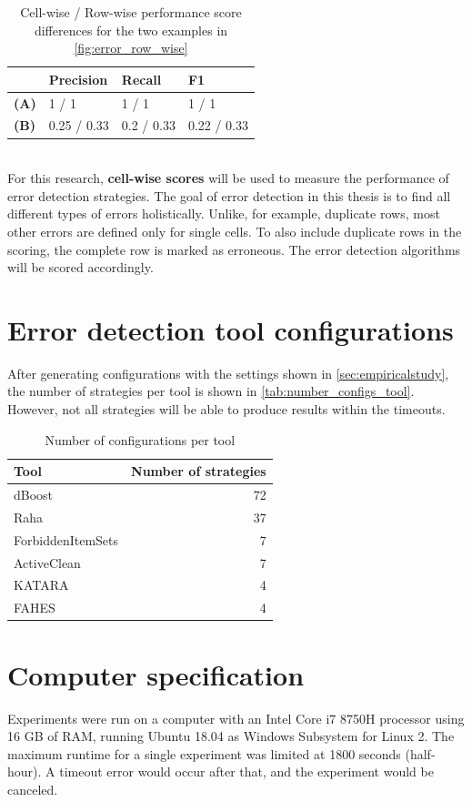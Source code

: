 \begin{table}[h]
\centering
\begin{tabular}{l|lll}
\textbf{}    & \textbf{Precision} & \textbf{Recall} & \textbf{F1} \\ \hline
\textbf{(A)} & 1 / 1              & 1 / 1           & 1 / 1       \\
\textbf{(B)} & 0.25 / 0.33        & 0.2 / 0.33      & 0.22 / 0.33
\end{tabular}
\caption{Cell-wise / Row-wise performance score differences for the two examples in \autoref{fig:error_row_wise}}
\label{tab:cell_vs_row_scores}
\end{table}

~\\For this research, \textbf{cell-wise scores} will be used to measure the performance of error detection strategies. The goal of error detection in this thesis is to find all different types of errors holistically. Unlike, for example, duplicate rows, most other errors are defined only for single cells. To also include duplicate rows in the scoring, the complete row is marked as erroneous. The error detection algorithms will be scored accordingly.

\section{Error detection tool configurations}
After generating configurations with the settings shown in \autoref{sec:empiricalstudy}, the number of strategies per tool is shown in \autoref{tab:number_configs_tool}. However, not all strategies will be able to produce results within the timeouts.

\begin{table}[H]
\centering
\begin{tabular}{lr}
\toprule
Tool &  Number of strategies \\
\midrule
dBoost            &                  72 \\
Raha              &                  37 \\
ForbiddenItemSets &                   7 \\
ActiveClean       &                   7 \\
KATARA            &                   4 \\
FAHES             &                   4 \\
\bottomrule
\end{tabular}
\caption{Number of configurations per tool}
\label{tab:number_configs_tool}
\end{table}


\section{Computer specification}
Experiments were run on a computer with an Intel Core i7 8750H processor using 16 GB of RAM, running Ubuntu 18.04 as Windows Subsystem for Linux 2. %
The maximum runtime for a single experiment was limited at 1800 seconds (half-hour). A timeout error would occur after that, and the experiment would be canceled. 
